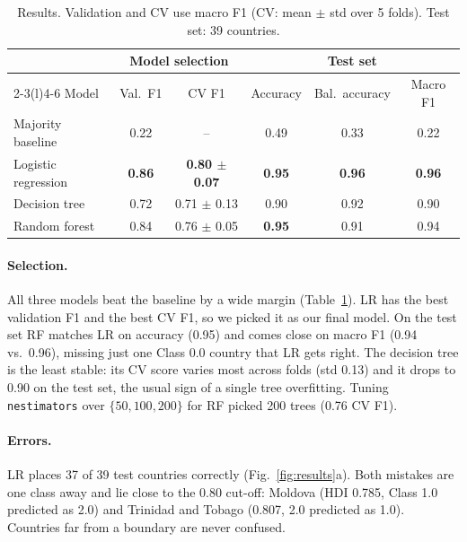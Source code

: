 \documentclass[10pt,a4paper]{article}
\renewcommand{\_}{\oldus\allowbreak}
\begin{document}
\begin{table}[h]
\centering
\footnotesize
\caption{Results. Validation and CV use macro F1 (CV: mean $\pm$ std over 5
folds). Test set: 39 countries.}
\label{tab:results}
\begin{tabular}{@{}lccccc@{}}
\toprule
& \multicolumn{2}{c}{Model selection} & \multicolumn{3}{c}{Test set} \\
\cmidrule(lr){2-3}\cmidrule(l){4-6}
Model & Val.\ F1 & CV F1 & Accuracy & Bal.\ accuracy & Macro F1 \\
\midrule
Majority baseline   & 0.22 & --                    & 0.49 & 0.33 & 0.22 \\
Logistic regression & \textbf{0.86} & \textbf{0.80 $\pm$ 0.07} & \textbf{0.95} & \textbf{0.96} & \textbf{0.96} \\
Decision tree       & 0.72 & 0.71 $\pm$ 0.13 & 0.90 & 0.92 & 0.90 \\
Random forest       & 0.84 & 0.76 $\pm$ 0.05 & \textbf{0.95} & 0.91 & 0.94 \\
\bottomrule
\end{tabular}
\end{table}

\paragraph{Selection.} All three models beat the baseline by a wide margin
(Table~\ref{tab:results}). LR has the best validation F1 and the best CV F1,
so we picked it as our final model. On the test set RF matches LR on
accuracy (0.95) and comes close on macro F1 (0.94 vs.\ 0.96), missing just
one Class 0.0 country that LR gets right. The decision tree is the least
stable: its CV score varies most across folds (std 0.13) and it drops to
0.90 on the test set, the usual sign of a single tree overfitting. Tuning
\texttt{n\_estimators} over $\{50, 100, 200\}$ for RF picked 200 trees
(0.76 CV F1).

\paragraph{Errors.} LR places 37 of 39 test countries correctly
(Fig.~\ref{fig:results}a). Both mistakes are one class away and lie close
to the 0.80 cut-off: Moldova (HDI 0.785, Class 1.0 predicted as 2.0) and
Trinidad and Tobago (0.807, 2.0 predicted as 1.0). Countries far from a
boundary are never confused.
\end{document}

